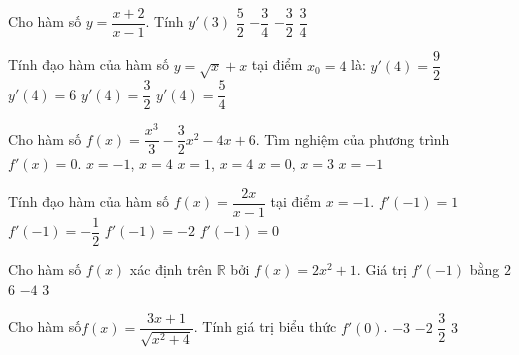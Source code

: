 \begin{ex}%
	Cho hàm số  $y=\dfrac{x+2}{x-1}$. Tính $y'\left(3\right)$
	\choice 
		{$\dfrac{5}{2}$} 
		{\True $-\dfrac{3}{4}$} 
		 {$-\dfrac{3}{2}$}
		{$\dfrac{3}{4}$} 
\end{ex}

\begin{ex}%
	Tính  đạo hàm của hàm số $y=\sqrt{x}+x$ tại điểm $x_0=4$ là:
	\choice 
		 {$y'(4)=\dfrac{9}{2}$}
		 {$y'(4)=6$}
		 {$y'(4)=\dfrac{3}{2}$}
		{\True  $y'(4)=\dfrac{5}{4}$}
\end{ex}

\begin{ex}%
	Cho hàm số $f(x)=\dfrac{x^3}{3}-\dfrac{3}{2}x^2-4x + 6$. Tìm nghiệm của  phương trình $f'(x)=0$.
	 \choice
		 {\True $x=-1$, $x=4$}
		{$x=1$,  $x=4$}
		{$x=0$, $x=3$} 
		{$x=-1$} 
\end{ex}

\begin{ex}%
	Tính đạo hàm của hàm số  $ f(x)=\dfrac{2x}{x-1}$ tại điểm $ x=-1$.
	 \choice
		{$ f'\left(-1\right)=1$} 
		{\True $  f'\left(-1\right)=-\dfrac{1}{2}$}
		 {$ f'\left(-1\right)=-2$}
		 {$ f'\left(-1\right)=0$}
\end{ex}

\begin{ex}%
	Cho hàm số $ f(x)$ xác định trên $\mathbb{R}$  bởi $ f(x)=2x^2+1$. Giá trị $f'\left(-1\right)$ bằng
	 \choice
		{$2$} 
		 {$6$}
		 {\True $-4$}
		{$3$} 
\end{ex}

\begin{ex}%
	Cho hàm số$ f(x)=\dfrac{3x+1}{\sqrt{x^2+4}}$. Tính giá trị biểu  thức $f'(0)$.
	\choice 
		{$-3$} 
		 {$-2$}
		{\True $\dfrac{3}{2}$} 
		{$3$} 
\end{ex}

